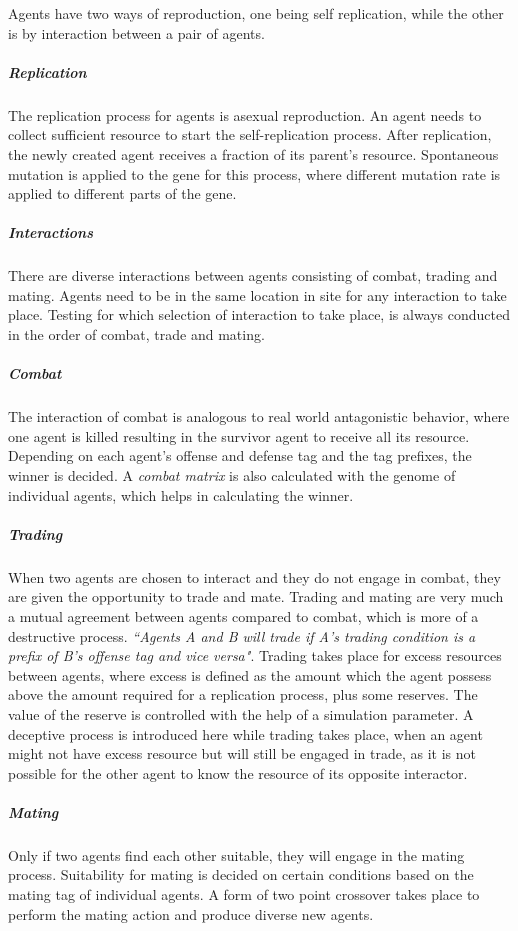 \documentclass[letterpaper]{article}
\numberwithin{equation}{section}
\begin{document}
Agents have two ways of reproduction, one being self replication, while the other is by interaction between a pair of agents. 

\subparagraph{Replication}
The replication process for agents is asexual reproduction. An agent needs to collect sufficient resource to start the self-replication process. After replication, the newly created agent receives a fraction of its parent's resource. Spontaneous mutation is applied to the gene for this process, where different mutation rate is applied to different parts of the gene. 

\subparagraph{Interactions}
There are diverse interactions between agents consisting of combat, trading and mating. Agents need to be in the same location in site for any interaction to take place. Testing for which selection of interaction to take place, is always conducted in the order of combat, trade and mating.

\subparagraph{Combat}
The interaction of combat is analogous to real world antagonistic behavior, where one agent is killed resulting in the survivor agent to receive all its resource. Depending on each agent's offense and defense tag and the tag prefixes, the winner is decided. A \textsl{combat matrix} is also calculated with the genome of individual agents, which helps in calculating the winner.

\subparagraph{Trading}
When two agents are chosen to interact and they do not engage in combat, they are given the opportunity to trade and mate. Trading and mating are very much a mutual agreement between agents compared to combat, which is more of a destructive process. \textsl{``Agents A and B will trade if A's trading condition is a prefix of B's offense tag and vice versa"}. Trading takes place for excess resources between agents, where excess is defined as the amount which the agent possess above the amount required for a replication process, plus some reserves. The value of the reserve is controlled with the help of a simulation parameter. A deceptive process is introduced here while trading takes place, when an agent might not have excess resource but will still be engaged in trade, as it is not possible for the other agent to know the resource of its opposite interactor. 

\subparagraph{Mating}
Only if two agents find each other suitable, they will engage in the mating process. Suitability for mating is decided on certain conditions based on the mating tag of individual agents. A form of two point crossover takes place to perform the mating action and produce diverse new agents. 
\end{document}

